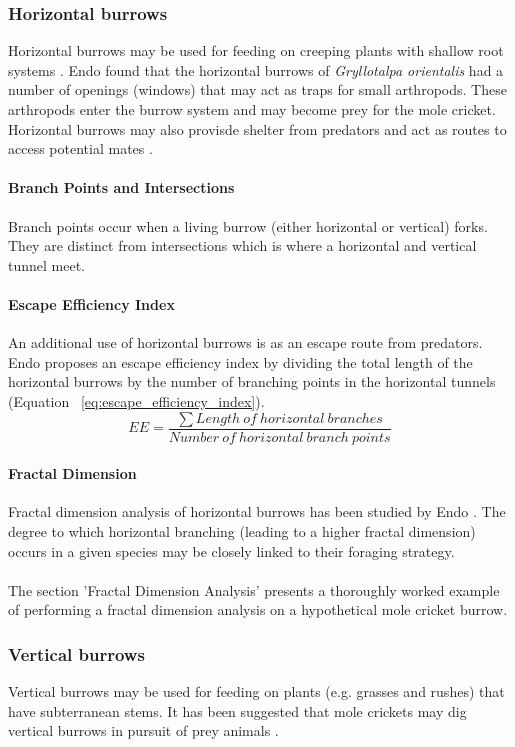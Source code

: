 \documentclass{article}
\begin{document}
   \subsubsection{Horizontal burrows}
   Horizontal burrows may be used for feeding on creeping plants with shallow root systems \cite{endo2007}. Endo \cite{endo2007} found that the horizontal burrows of \textit{Gryllotalpa orientalis} had a number of openings (windows) that may act as traps for small arthropods. These arthropods enter the burrow system and may become prey for the mole cricket. Horizontal burrows may also provisde shelter from predators and act as routes to access potential mates \cite{endo2007}.
   \paragraph{Branch Points and Intersections}
   Branch points occur when a living burrow (either horizontal or vertical) forks. They are distinct from intersections which is where a horizontal and vertical tunnel meet.
   \paragraph{Escape Efficiency Index}
   An additional use of horizontal burrows is as an escape route from predators. Endo \cite{endo2008} proposes an escape efficiency index by dividing the total length of the horizontal burrows by the number of branching points in the horizontal tunnels (Equation ~\ref{eq:escape_efficiency_index}).
   \begin{equation}
   EE = \frac{\sum{Length\ of\ horizontal\ branches}}{Number\ of\ horizontal\ branch\ points}
   \label{eq:escape_efficiency_index}
   \end{equation}
   \paragraph{Fractal Dimension}
   Fractal dimension analysis of horizontal burrows has been studied by Endo \cite{endo2008}. The degree to which horizontal branching (leading to a higher fractal dimension) occurs in a given species may be closely linked to their foraging strategy. 
   \paragraph{}
   The section 'Fractal Dimension Analysis' presents a thoroughly worked example of performing a fractal dimension analysis on a hypothetical mole cricket burrow.
   \subsubsection{Vertical burrows}
   Vertical burrows may be used for feeding on plants (e.g. grasses and rushes) that have subterranean stems. It has been suggested that mole crickets may dig vertical burrows in pursuit of prey animals \cite{brandenburg2002}.
\end{document}
